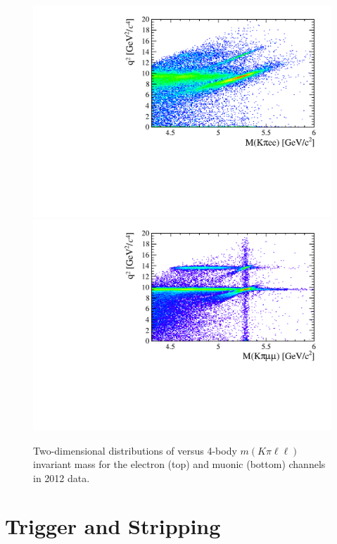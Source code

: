 \begin{figure}[t!]
\centering 
\includegraphics[width=1.\textwidth]{RKst/figs/electron_B0jpsi2D_selected.pdf}
\includegraphics[width=1.\textwidth]{RKst/figs/muon_B0jpsi2D_selected.pdf}
\caption{Two-dimensional distributions of \qsq versus 4-body $m(K\pi\ell\ell)$
invariant mass for the electron (top) and muonic (bottom) channels in 2012 data.}
\label{fig:2D_q2_B0mass}
\end{figure}


\section{Trigger and Stripping }
\label{sec:RKst_trigstripping}

